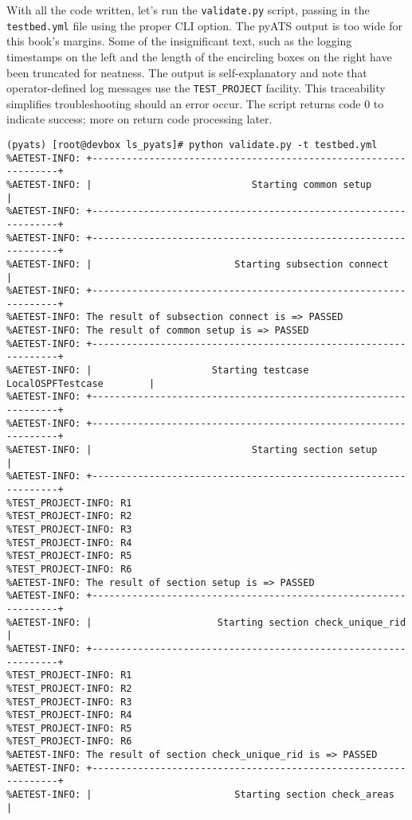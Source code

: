 With all the code written, let's run the \verb|validate.py| script, passing in
the \verb|testbed.yml| file using the proper CLI option. The pyATS output is
too wide for this book's margins. Some of the insignificant text, such as the
logging timestamps on the left and the length of the encircling boxes on the
right have been truncated for neatness. The output is self-explanatory and
note that operator-defined log messages use the \verb|TEST_PROJECT| facility.
This traceability simplifies troubleshooting should an error occur. The script
returns code 0 to indicate success; more on return code processing later.

\begin{verbatim}
(pyats) [root@devbox ls_pyats]# python validate.py -t testbed.yml
%AETEST-INFO: +----------------------------------------------------------------+
%AETEST-INFO: |                            Starting common setup               |
%AETEST-INFO: +----------------------------------------------------------------+
%AETEST-INFO: +----------------------------------------------------------------+
%AETEST-INFO: |                         Starting subsection connect            |
%AETEST-INFO: +----------------------------------------------------------------+
%AETEST-INFO: The result of subsection connect is => PASSED
%AETEST-INFO: The result of common setup is => PASSED
%AETEST-INFO: +----------------------------------------------------------------+
%AETEST-INFO: |                     Starting testcase LocalOSPFTestcase        |
%AETEST-INFO: +----------------------------------------------------------------+
%AETEST-INFO: +----------------------------------------------------------------+
%AETEST-INFO: |                            Starting section setup              |
%AETEST-INFO: +----------------------------------------------------------------+
%TEST_PROJECT-INFO: R1
%TEST_PROJECT-INFO: R2
%TEST_PROJECT-INFO: R3
%TEST_PROJECT-INFO: R4
%TEST_PROJECT-INFO: R5
%TEST_PROJECT-INFO: R6
%AETEST-INFO: The result of section setup is => PASSED
%AETEST-INFO: +----------------------------------------------------------------+
%AETEST-INFO: |                      Starting section check_unique_rid         |
%AETEST-INFO: +----------------------------------------------------------------+
%TEST_PROJECT-INFO: R1
%TEST_PROJECT-INFO: R2
%TEST_PROJECT-INFO: R3
%TEST_PROJECT-INFO: R4
%TEST_PROJECT-INFO: R5
%TEST_PROJECT-INFO: R6
%AETEST-INFO: The result of section check_unique_rid is => PASSED
%AETEST-INFO: +----------------------------------------------------------------+
%AETEST-INFO: |                         Starting section check_areas           |

\end{verbatim}
